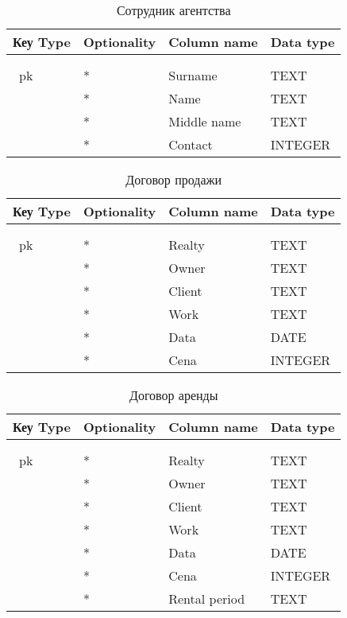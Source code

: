 \begin{xltabular}{\textwidth}{|l|l|X|X|}
	\caption{Сотрудник агентства\label{wort:table}}\\ \hline
	\centrow Кеу Type & \centrow Optionality & \centrow Column name & \centrow Data type \\ \hline
	 &  &  &  \\ \hline
	\endfirsthead
	 &  &  &  \\ \hline
	\finishhead
	\ pk & * & Surname & TEXT \\ \hline
	& * & Name & TEXT \\ \hline
	& * & Middle name & TEXT \\ \hline
	& * & Contact & INTEGER \\ \hline
\end{xltabular}

\begin{xltabular}{\textwidth}{|l|l|X|X|}
	\caption{Договор продажи\label{sale:table}}\\ \hline
	\centrow Кеу Type & \centrow Optionality & \centrow Column name & \centrow Data type \\ \hline
	 &  &  &  \\ \hline
	\endfirsthead
	 &  &  &  \\ \hline
	\finishhead
	\ pk & * & Realty & TEXT \\ \hline
	& * & Owner & TEXT \\ \hline
	& * & Client & TEXT \\ \hline
	& * & Work & TEXT \\ \hline
	& * & Data & DATE \\ \hline
	& * & Cena & INTEGER \\ \hline
\end{xltabular}

\begin{xltabular}{\textwidth}{|l|l|X|X|}
	\caption{Договор аренды\label{renta:table}}\\ \hline
	\centrow Кеу Type & \centrow Optionality & \centrow Column name & \centrow Data type \\ \hline
	 &  &  &  \\ \hline
	\endfirsthead
	 &  &  &  \\ \hline
	\finishhead
	\ pk & * & Realty & TEXT \\ \hline
	& * & Owner & TEXT \\ \hline
	& * & Client & TEXT \\ \hline
	& * & Work & TEXT \\ \hline
	& * & Data & DATE \\ \hline
	& * & Cena & INTEGER \\ \hline
	& * & Rental period & TEXT \\ \hline
\end{xltabular}
